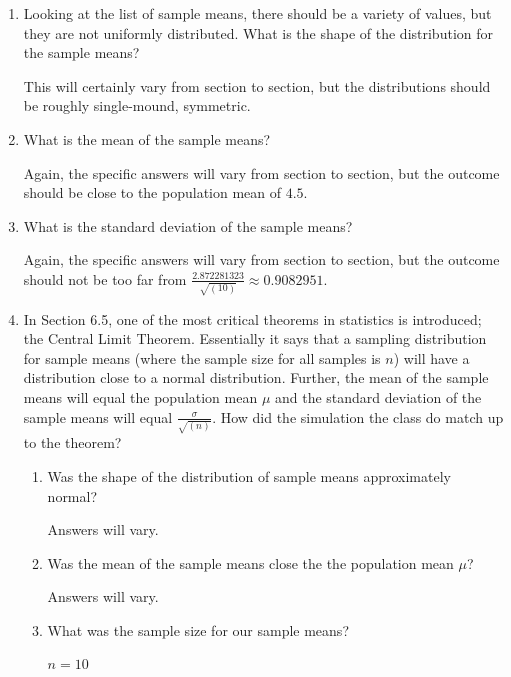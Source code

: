 \documentclass[11pt]{article}
\newcommand{\answer}[1]{\color{white}#1}
\begin{document}
\begin{enumerate}
\begin{center}
\end{center}

\begin{enumerate}

\item Looking at the list of sample means, there should be a variety of values, but they are not uniformly distributed. What is the shape of the distribution for the sample means?

{\answer This will certainly vary from section to section, but the distributions should be roughly single-mound, symmetric.
} 

\item What is the mean of the sample means? 

{\answer Again, the specific answers will vary from section to section, but the outcome should be close to the population mean of $4.5$.
} 

\item What is the standard deviation of the sample means? 

{\answer Again, the specific answers will vary from section to section, but the outcome should not be too far from $\frac{2.872281323}{\sqrt{(10)}} \approx 0.9082951$.
} 

\item In Section 6.5, one of the most critical theorems in statistics is introduced; the Central Limit Theorem. Essentially it says that a sampling distribution for sample means (where the sample size for all samples is $n$) will have a distribution close to a normal distribution. Further, the mean of the sample means will equal the population mean $\mu$ and the standard deviation of the sample means will equal $\frac{\sigma}{\sqrt{(n)}}$. How did the simulation the class do match up to the theorem? 

	\begin{enumerate}
	
	\item Was the shape of the distribution of sample means approximately normal? 
	
	{\answer Answers will vary.
	} 
	
	\item Was the mean of the sample means close the the population mean $\mu$? 
	
	{\answer Answers will vary.
	} 
	
	\item What was the sample size for our sample means? 
	
	{\answer $n = 10$ 
	} 
	

\end{enumerate}
\end{enumerate}
\end{enumerate}
\end{document}
